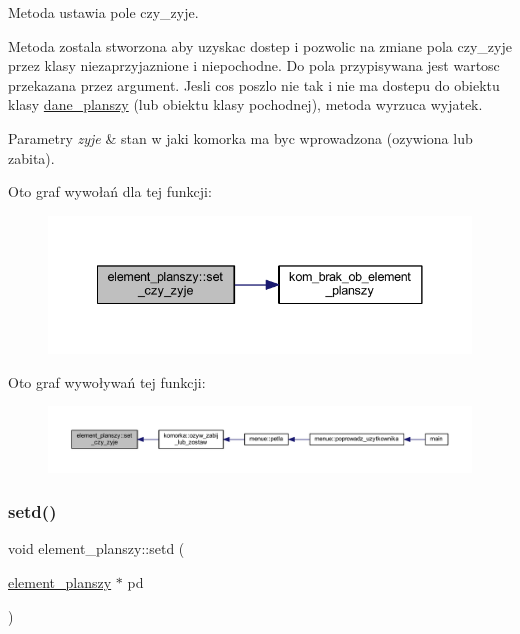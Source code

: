 Metoda ustawia pole czy\+\_\+zyje.

Metoda zostala stworzona aby uzyskac dostep i pozwolic na zmiane pola czy\+\_\+zyje przez klasy niezaprzyjaznione i niepochodne. Do pola przypisywana jest wartosc przekazana przez argument. Jesli cos poszlo nie tak i nie ma dostepu do obiektu klasy \mbox{\hyperlink{classdane__planszy}{dane\+\_\+planszy}} (lub obiektu klasy pochodnej), metoda wyrzuca wyjatek. 
\begin{DoxyParams}{Parametry}
{\em zyje} & stan w jaki komorka ma byc wprowadzona (ozywiona lub zabita). \\
\hline
\end{DoxyParams}
Oto graf wywołań dla tej funkcji\+:
\nopagebreak
\begin{figure}[H]
\begin{center}
\leavevmode
\includegraphics[width=341pt]{classelement__planszy_a0b46a16355fcb3123ad3d1a889de5e1f_cgraph}
\end{center}
\end{figure}
Oto graf wywoływań tej funkcji\+:
\nopagebreak
\begin{figure}[H]
\begin{center}
\leavevmode
\includegraphics[width=350pt]{classelement__planszy_a0b46a16355fcb3123ad3d1a889de5e1f_icgraph}
\end{center}
\end{figure}
\mbox{\label{classelement__planszy_a6f76a013512cd1d2e3f9c1785217c58d}} 
\subsubsection{\texorpdfstring{setd()}{setd()}}
{\footnotesize\ttfamily void element\+\_\+planszy\+::setd (\begin{DoxyParamCaption}\item[{\mbox{\hyperlink{classelement__planszy}{element\+\_\+planszy}} $\ast$}]{pd }\end{DoxyParamCaption})}

